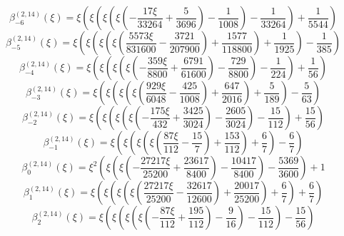 \begin{equation}
\beta_{-6}^{(2,14)} (\xi) =
 \xi \left(\xi \left(\xi \left(\xi \left(- \frac{17 \xi}{33264}
 + \frac{5}{3696}\right) - \frac{1}{1008}\right) - \frac{1}{33264}\right) + \frac{1}{5544}\right)
\end{equation}
\begin{equation}
\beta_{-5}^{(2,14)} (\xi) =
 \xi \left(\xi \left(\xi \left(\xi \left(\frac{5573 \xi}{831600}
 - \frac{3721}{207900}\right) + \frac{1577}{118800}\right) + \frac{1}{1925}\right) - \frac{1}{385}\right)
\end{equation}
\begin{equation}
\beta_{-4}^{(2,14)} (\xi) =
 \xi \left(\xi \left(\xi \left(\xi \left(- \frac{359 \xi}{8800}
 + \frac{6791}{61600}\right) - \frac{729}{8800}\right) - \frac{1}{224}\right) + \frac{1}{56}\right)
\end{equation}
\begin{equation}
\beta_{-3}^{(2,14)} (\xi) =
 \xi \left(\xi \left(\xi \left(\xi \left(\frac{929 \xi}{6048}
 - \frac{425}{1008}\right) + \frac{647}{2016}\right) + \frac{5}{189}\right) - \frac{5}{63}\right)
\end{equation}
\begin{equation}
\beta_{-2}^{(2,14)} (\xi) =
 \xi \left(\xi \left(\xi \left(\xi \left(- \frac{175 \xi}{432}
 + \frac{3425}{3024}\right) - \frac{2605}{3024}\right) - \frac{15}{112}\right) + \frac{15}{56}\right)
\end{equation}
\begin{equation}
\beta_{-1}^{(2,14)} (\xi) =
 \xi \left(\xi \left(\xi \left(\xi \left(\frac{87 \xi}{112}
 - \frac{15}{7}\right) + \frac{153}{112}\right) + \frac{6}{7}\right) - \frac{6}{7}\right)
\end{equation}
\begin{equation}
\beta_{0}^{(2,14)} (\xi) =
 \xi^{2} \left(\xi \left(\xi \left(- \frac{27217 \xi}{25200}
 + \frac{23617}{8400}\right) - \frac{10417}{8400}\right) - \frac{5369}{3600}\right) + 1
\end{equation}
\begin{equation}
\beta_{1}^{(2,14)} (\xi) =
 \xi \left(\xi \left(\xi \left(\xi \left(\frac{27217 \xi}{25200}
 - \frac{32617}{12600}\right) + \frac{20017}{25200}\right) + \frac{6}{7}\right) + \frac{6}{7}\right)
\end{equation}
\begin{equation}
\beta_{2}^{(2,14)} (\xi) =
 \xi \left(\xi \left(\xi \left(\xi \left(- \frac{87 \xi}{112}
 + \frac{195}{112}\right) - \frac{9}{16}\right) - \frac{15}{112}\right) - \frac{15}{56}\right)
\end{equation}
